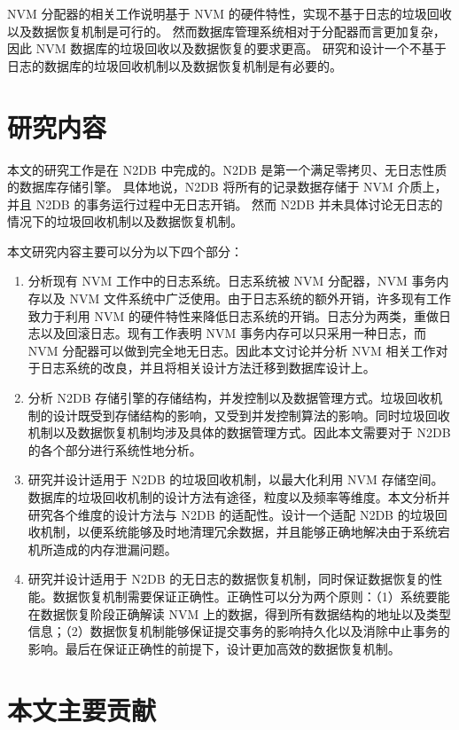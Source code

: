 NVM 分配器的相关工作说明基于 NVM 的硬件特性，实现不基于日志的垃圾回收以及数据恢复机制是可行的。
然而数据库管理系统相对于分配器而言更加复杂，因此 NVM 数据库的垃圾回收以及数据恢复的要求更高。
研究和设计一个不基于日志的数据库的垃圾回收机制以及数据恢复机制是有必要的。

\section{研究内容}

本文的研究工作是在 N2DB 中完成的。N2DB 是第一个满足零拷贝、无日志性质的数据库存储引擎。
具体地说，N2DB 将所有的记录数据存储于 NVM 介质上，并且 N2DB 的事务运行过程中无日志开销。
然而 N2DB 并未具体讨论无日志的情况下的垃圾回收机制以及数据恢复机制。

本文研究内容主要可以分为以下四个部分：
\begin{enumerate}
    \item 分析现有 NVM 工作中的日志系统。日志系统被 NVM 分配器，NVM 事务内存以及 NVM 文件系统中广泛使用。由于日志系统的额外开销，许多现有工作致力于利用 NVM 的硬件特性来降低日志系统的开销。日志分为两类，重做日志以及回滚日志。现有工作表明 NVM 事务内存可以只采用一种日志，而 NVM 分配器可以做到完全地无日志。因此本文讨论并分析 NVM 相关工作对于日志系统的改良，并且将相关设计方法迁移到数据库设计上。
    \item 分析 N2DB 存储引擎的存储结构，并发控制以及数据管理方式。垃圾回收机制的设计既受到存储结构的影响，又受到并发控制算法的影响。同时垃圾回收机制以及数据恢复机制均涉及具体的数据管理方式。因此本文需要对于 N2DB 的各个部分进行系统性地分析。
    \item 研究并设计适用于 N2DB 的垃圾回收机制，以最大化利用 NVM 存储空间。数据库的垃圾回收机制的设计方法有途径，粒度以及频率等维度。本文分析并研究各个维度的设计方法与 N2DB 的适配性。设计一个适配 N2DB 的垃圾回收机制，以便系统能够及时地清理冗余数据，并且能够正确地解决由于系统宕机所造成的内存泄漏问题。
    \item 研究并设计适用于 N2DB 的无日志的数据恢复机制，同时保证数据恢复的性能。数据恢复机制需要保证正确性。正确性可以分为两个原则：（1）系统要能在数据恢复阶段正确解读 NVM 上的数据，得到所有数据结构的地址以及类型信息；（2）数据恢复机制能够保证提交事务的影响持久化以及消除中止事务的影响。最后在保证正确性的前提下，设计更加高效的数据恢复机制。
\end{enumerate}

\section{本文主要贡献}

